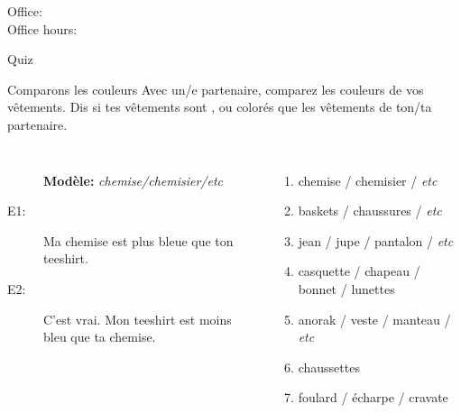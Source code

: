 \documentclass{beamer}
\subtitle[Couleurs, comparatifs, superlatifs]{Les couleurs, les comparatifs et les superlatifs des adjectifs}
\begin{document}
  \begin{frame}
    \titlepage
    \tiny{Office: \\
          Office hours: }
  \end{frame}

  \begin{frame}{}
    \begin{center}
      \Large Quiz
    \end{center}
  \end{frame}

  \begin{frame}{Comparons les couleurs}
    Avec un/e partenaire, comparez les couleurs de vos vêtements.
    Dis si tes vêtements sont ,  ou  colorés que les vêtements de ton/ta partenaire.
    \begin{columns}
        \begin{description}
          \item[] \textbf{Modèle:} \emph{chemise/chemisier/etc}
          \item[E1:] Ma chemise est plus bleue que ton teeshirt.
          \item[] 
          \item[E2:] C'est vrai. Mon teeshirt est moins bleu que ta chemise.
          \item[] 
        \end{description}
        \begin{enumerate}
          \item chemise / chemisier / \emph{etc}
          \item baskets / chaussures / \emph{etc}
          \item jean / jupe / pantalon / \emph{etc}
          \item casquette / chapeau / bonnet / lunettes
          \item anorak / veste / manteau / \emph{etc}
          \item chaussettes
          \item foulard / écharpe / cravate
        \end{enumerate}
    \end{columns}
  \end{frame}
\end{document}
